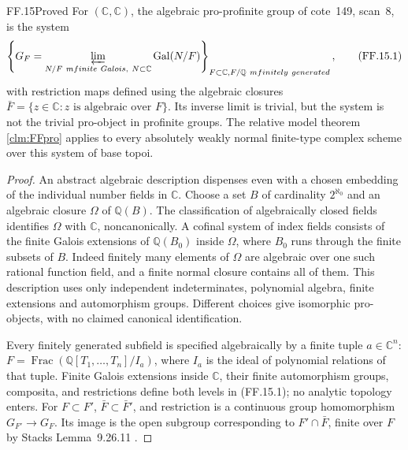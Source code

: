 \begin{claim}{FF.15}{Proved}\label{clm:FFcomplex}
For \((\mathbb C,\mathbb C)\), the algebraic pro-profinite
group of cote~149, scan~8, is the system
\[
 \left\{
   G_F=\varprojlim_{N/F\ {
m finite\ Galois},\ N\subset\mathbb C}
             \operatorname{Gal}(N/F)
 \right\}_{F\subset\mathbb C, F/\mathbb Q\ {
m finitely\ generated}},
                                                               \tag{FF.15.1}
\]
with restriction maps defined using the algebraic closures
\(\bar F=\{z\in\mathbb C:z\text{ is algebraic over }F\}\).
Its inverse limit is trivial, but the system is not the trivial
pro-object in profinite groups. The relative model theorem
\ref{clm:FFpro} applies to every absolutely weakly normal
finite-type complex scheme over this system of base topoi.
\end{claim}
\begin{proof}
An abstract algebraic description dispenses even with a chosen
embedding of the individual number fields in \(\mathbb C\).
Choose a set \(B\) of cardinality \(2^{\aleph_0}\) and an
algebraic closure \(\Omega\) of \(\mathbb Q(B)\).
The classification of algebraically closed fields identifies
\(\Omega\) with \(\mathbb C\), noncanonically.
A cofinal system of index fields consists of the finite Galois
extensions of \(\mathbb Q(B_0)\) inside \(\Omega\), where
\(B_0\) runs through the finite subsets of \(B\).
Indeed finitely many elements of \(\Omega\) are algebraic over
one such rational function field, and a finite normal closure
contains all of them. This description uses only independent
indeterminates, polynomial algebra, finite extensions and
automorphism groups. Different choices give isomorphic pro-objects,
with no claimed canonical identification.

Every finitely generated subfield is specified algebraically by
a finite tuple \(a\in\mathbb C^n\):
\(F=\operatorname{Frac}(\mathbb Q[T_1,\ldots,T_n]/I_a)\),
where \(I_a\) is the ideal of polynomial relations of that tuple.
Finite Galois extensions inside \(\mathbb C\), their finite
automorphism groups, composita, and restrictions define both
levels in (FF.15.1); no analytic topology enters. For
\(F\subset F'\), \(\bar F\subset\bar F'\), and restriction
is a continuous group homomorphism \(G_{F'}\to G_F\).
Its image is the open subgroup corresponding to
\(F'\cap\bar F\), finite over \(F\) by Stacks
Lemma~9.26.11 \citep{FF_StacksFields}.


\end{proof}
